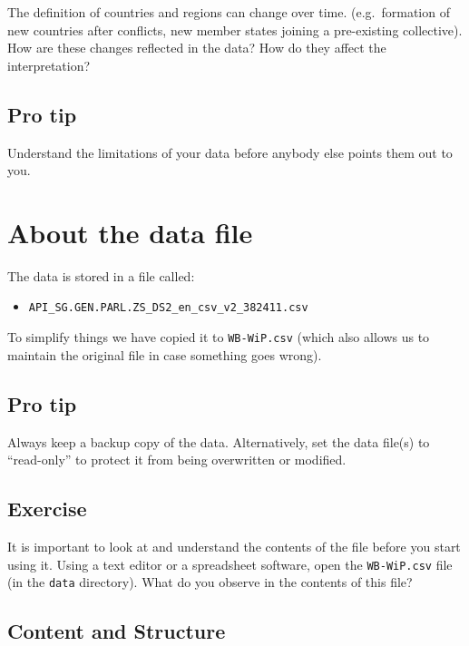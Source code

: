 \documentclass[a4paper,9pt,twocolumn,twoside,]{pinp}
\providecommand{\tightlist}{%
  \setlength{\itemsep}{0pt}\setlength{\parskip}{0pt}}
\begin{document}
The definition of countries and regions can change over time.
(e.g.~formation of new countries after conflicts, new member states
joining a pre-existing collective). How are these changes reflected in
the data? How do they affect the interpretation?

\hypertarget{pro-tip}{%
\subsection{Pro tip}\label{pro-tip}}

Understand the limitations of your data before anybody else points them
out to you.

\hypertarget{about-the-data-file}{%
\section{About the data file}\label{about-the-data-file}}

The data is stored in a file called:

\begin{itemize}
\tightlist
\item
  \texttt{API\_SG.GEN.PARL.ZS\_DS2\_en\_csv\_v2\_382411.csv}
\end{itemize}

To simplify things we have copied it to \texttt{WB-WiP.csv} (which also
allows us to maintain the original file in case something goes wrong).

\hypertarget{pro-tip-1}{%
\subsection{Pro tip}\label{pro-tip-1}}

Always keep a backup copy of the data. Alternatively, set the data
file(s) to ``read-only'' to protect it from being overwritten or
modified.

\hypertarget{exercise}{%
\subsection{Exercise}\label{exercise}}

It is important to look at and understand the contents of the file
before you start using it. Using a text editor or a spreadsheet
software, open the \texttt{WB-WiP.csv} file (in the \texttt{data}
directory). What do you observe in the contents of this file?

\hypertarget{content-and-structure}{%
\subsection{Content and Structure}\label{content-and-structure}}
\end{document}
